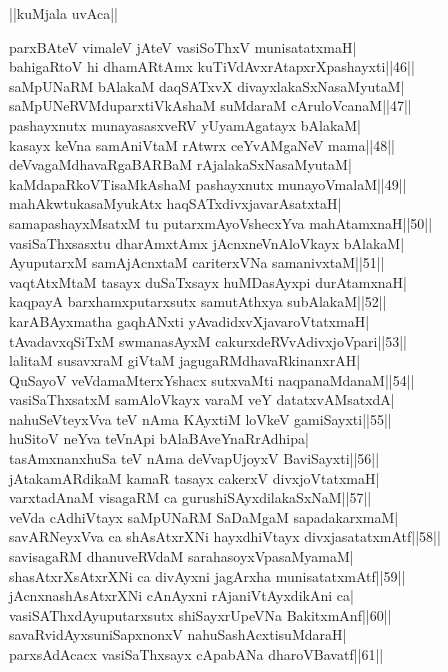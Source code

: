 \documentclass{article}
\begin{document}
\begin{center}
||kuMjala uvAca||
\end{center}

parxBAteV vimaleV jAteV vasiSoThxV munisatatxmaH|\\
bahigaRtoV hi dhamARtAmx kuTiVdAvxrAtapxrXpashayxti||46||\\
saMpUNaRM bAlakaM daqSATxvX divayxlakaSxNasaMyutaM|\\
saMpUNeRVMduparxtiVkAshaM suMdaraM cAruloVcanaM||47||\\
pashayxnutx munayasasxveRV yUyamAgatayx bAlakaM|\\
kasayx keVna samAniVtaM rAtwrx ceYvAMgaNeV mama||48||\\
deVvagaMdhavaRgaBARBaM rAjalakaSxNasaMyutaM|\\
kaMdapaRkoVTisaMkAshaM pashayxnutx munayoVmalaM||49||\\
mahAkwtukasaMyukAtx haqSATxdivxjavarAsatxtaH|\\
samapashayxMsatxM tu putarxmAyoVshecxYva mahAtamxnaH||50||\\
vasiSaThxsasxtu dharAmxtAmx jAcnxneVnAloVkayx bAlakaM|\\
AyuputarxM samAjAcnxtaM cariterxVNa samanivxtaM||51||\\
vaqtAtxMtaM tasayx duSaTxsayx huMDasAyxpi durAtamxnaH|\\
kaqpayA barxhamxputarxsutx samutAthxya subAlakaM||52||\\
karABAyxmatha gaqhANxti yAvadidxvXjavaroVtatxmaH|\\
tAvadavxqSiTxM swmanasAyxM cakurxdeRVvAdivxjoVpari||53||\\
lalitaM susavxraM giVtaM jagugaRMdhavaRkinanxrAH|\\
QuSayoV veVdamaMterxYshacx sutxvaMti naqpanaMdanaM||54||\\
vasiSaThxsatxM samAloVkayx varaM veY datatxvAMsatxdA|\\
nahuSeVteyxVva teV nAma KAyxtiM loVkeV gamiSayxti||55||\\
huSitoV neYva teVnApi bAlaBAveYnaRrAdhipa|\\
tasAmxnanxhuSa teV nAma deVvapUjoyxV BaviSayxti||56||\\
jAtakamARdikaM kamaR tasayx cakerxV divxjoVtatxmaH|\\
varxtadAnaM visagaRM ca gurushiSAyxdilakaSxNaM||57||\\
veVda cAdhiVtayx saMpUNaRM SaDaMgaM sapadakarxmaM|\\
savARNeyxVva ca shAsAtxrXNi hayxdhiVtayx divxjasatatxmAtf||58||\\
savisagaRM dhanuveRVdaM sarahasoyxVpasaMyamaM|\\
shasAtxrXsAtxrXNi ca divAyxni jagArxha munisatatxmAtf||59||\\
jAcnxnashAsAtxrXNi cAnAyxni rAjaniVtAyxdikAni ca|\\
vasiSAThxdAyuputarxsutx shiSayxrUpeVNa BakitxmAnf||60||\\
savaRvidAyxsuniSapxnonxV nahuSashAcxtisuMdaraH|\\
parxsAdAcacx vasiSaThxsayx cApabANa dharoVBavatf||61||
\end{document}
